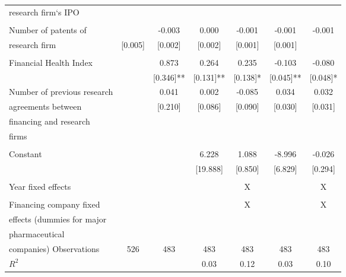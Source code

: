 \begin{tabular}{lcccccc}
\quad research firm`s IPO\\
\\
Number of patents of&&-0.003 &0.000 &-0.001 &-0.001 &-0.001\\
\quad research firm &[0.005] &[0.002]& [0.002] &[0.001] &[0.001]\\ 
\\
Financial Health Index&&0.873 &0.264 &0.235 &-0.103 &-0.080\\
&&[0.346]**& [0.131]**& [0.138]*& [0.045]**& [0.048]*\\
Number of previous research&&0.041 &0.002& -0.085& 0.034 &0.032\\ 
\quad agreements between&&[0.210]& [0.086] &[0.090] &[0.030] &[0.031]\\
\quad financing and research \\ 
\quad firms\\
\\
Constant&&&6.228 &1.088 &-8.996 &-0.026\\
&&&[19.888] &[0.850] &[6.829] &[0.294]\\
\\
Year fixed effects&&&&X&&X\\
\\
Financing company fixed&&&&X&&X\\
\quad effects (dummies for major \\
\quad pharmaceutical \\
\quad companies)
Observations&526 &483 &483 &483& 483 &483\\
$R^2$&&&0.03&0.12& 0.03 &0.10 \\ \hline

\end{tabular}
